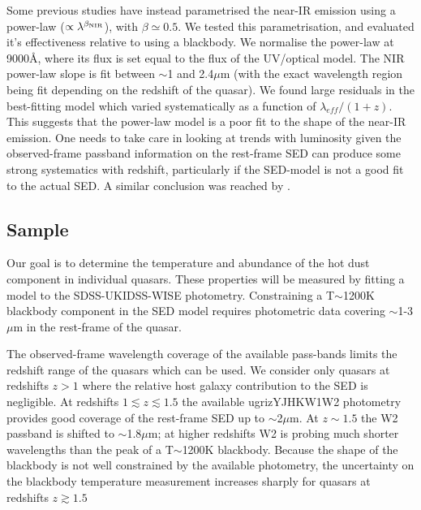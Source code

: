 Some previous studies \citep[e.g.][]{wang13,zhang14} have instead parametrised the near-IR emission using a power-law ($\propto \lambda^{\beta_{\rm NIR}}$), with $\beta \simeq 0.5$. 
We tested this parametrisation, and evaluated it's effectiveness relative to using a blackbody. 
We normalise the power-law at 9000\AA, where its flux is set equal to the flux of the UV/optical model. 
The NIR power-law slope is fit between $\sim$1 and 2.4$\mu$m (with the exact wavelength region being fit depending on the redshift of the quasar). 
We found large residuals in the best-fitting model which varied systematically as a function of $\lambda_{eff}/(1+z)$.  
This suggests that the power-law model is a poor fit to the shape of the near-IR emission. 
One needs to take care in looking at trends with luminosity given the observed-frame passband information on the rest-frame SED can produce some strong systematics with redshift, particularly if the SED-model is not a good fit to the actual SED. 
A similar conclusion was reached by \citet{gallagher07}.

\subsection{Sample}

Our goal is to determine the temperature and abundance of the hot dust component in individual quasars.  
These properties will be measured by fitting a model to the SDSS-UKIDSS-WISE photometry. 
Constraining a T$\sim$1200K blackbody component in the SED model requires photometric data covering $\sim$1-3$\mu$m in the rest-frame of the quasar. 

The observed-frame wavelength coverage of the available pass-bands limits the redshift range of the quasars which can be used. 
We consider only quasars at redshifts $z>1$ where the relative host galaxy contribution to the SED is negligible. 
At redshifts $1 \lesssim z \lesssim 1.5$ the available ugrizYJHKW1W2 photometry provides good coverage of the rest-frame SED up to $\sim$2$\mu$m.
At $z\sim1.5$ the W2 passband is shifted to $\sim$1.8$\mu$m; at higher redshifts W2 is probing much shorter wavelengths than the peak of a T$\sim$1200K blackbody. 
Because the shape of the blackbody is not well constrained by the available photometry, the uncertainty on the blackbody temperature measurement increases sharply for quasars at redshifts $z\gtrsim1.5$ 

